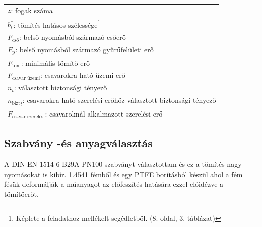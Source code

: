 \begin{center}
	\begin{tabular}{l}
		$z$: fogak száma \siunit{}{db} \\
		$b_t^*$: tömítés hatásos szélessége\protect\footnote{Képlete a feladathoz mellékelt segédletből. (8. oldal, 3. táblázat)} \siunit{}{\mm} \\
		$F_\text{cső}$: belső nyomásból származó csőerő \siunit{}{\newton} \\
		$F_\text{p}$: belső nyomásból származó gyűrűfelületi erő \siunit{}{\newton} \\
		$F_\text{töm}$: minimális tömítő erő \siunit{}{\newton} \\
		$F_\text{csavar üzemi}$: csavarokra ható üzemi erő \siunit{}{\newton} \\
		$n_t$: választott biztonsági tényező \siunit{}{-} \\
		${n_\text{bizt}}_t$: csavarokra ható szerelési erőhöz választott biztonsági tényező \siunit{}{-} \\
		$F_\text{csavar szerelési}$: csavaroknál alkalmazott szerelési erő \siunit{}{\newton} \\
	\end{tabular}
\end{center}

\newpage
\subsection{Szabvány -és anyagválasztás}
A DIN EN 1514-6 B29A PN100 szabványt választottam és ez a tömítés nagy nyomásokat is kibír. 1.4541 fémből és egy PTFE borításból készül ahol a fém fésük deformálják a műanyagot az előfeszítés hatására ezzel előidézve a tömítőerőt.

